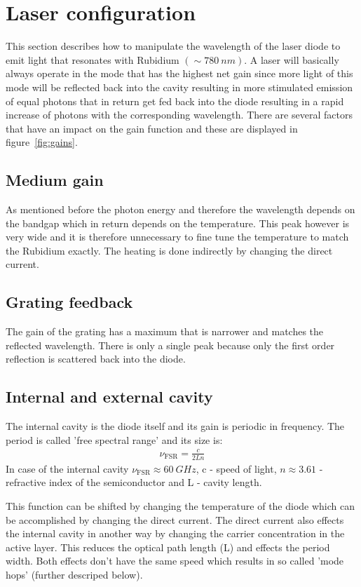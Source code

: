 \section{Laser configuration}
This section describes how to manipulate the wavelength of the laser diode to emit light that resonates with Rubidium $(\sim \SI{780}{nm})$. A laser will basically always operate in the mode that has the highest net gain since more light of this mode will be reflected back into the cavity resulting in more stimulated emission of equal photons that in return get fed back into the diode resulting in a rapid increase of photons with the corresponding wavelength. There are several factors that have an impact on the gain function and these are displayed in \mbox{figure \ref{fig:gains}}.

\subsection{Medium gain}
As mentioned before the photon energy and therefore the wavelength depends on the bandgap which in return depends on the temperature. This peak however is very wide and it is therefore unnecessary to fine tune the temperature to match the Rubidium exactly. The heating is done indirectly by changing the direct current.

\subsection{Grating feedback}
The gain of the grating has a maximum that is narrower and matches the reflected wavelength. There is only a single peak because only the first order reflection is scattered back into the diode.

\subsection{Internal and external cavity}
The internal cavity is the diode itself and its gain is periodic in frequency. The period is called 'free spectral range' and its size is:
\begin{align}
	\nu_\text{FSR} = \frac{c}{2Ln}
\end{align}
In case of the internal cavity $\nu_\text{FSR} \approx \SI{60}{GHz}$, c - speed of light, $n\approx3.61$ - refractive index of the semiconductor and L - cavity length.

This function can be shifted by changing the temperature of the diode which can be accomplished by changing the direct current.
The direct current also effects the internal cavity in another way by changing the carrier concentration in the active layer. This reduces the optical path length (L) and effects the period width. Both effects don't have the same speed which results in so called 'mode hops' (further descriped below).

